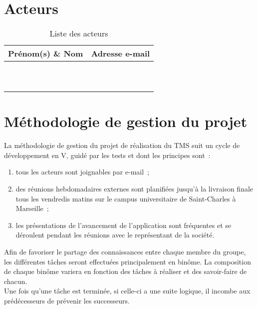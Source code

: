 \documentclass[11pt,fleqn]{report}
\begin{document}
\section{Acteurs}
\begin{table}[htbp]
	\begin{tabularx}{\linewidth}{X X}
		\toprule
		\textbf{Prénom(s) \& Nom} & \textbf{Adresse e-mail} \\
		\midrule
		\Agopian & \AgopianEmail \\
		\hline
		\Balde & \BaldeEmail \\
		\hline
		\Cadon & \CadonEmail \\
		\hline
		\Gairoard & \GairoardEmail \\
		\hline
		\Julien & \JulienEmail \\
		\hline
		\Lericolais & \LericolaisEmail \\
		\hline
		\Mezelle & \MezelleEmail \\
		\hline
		\Pachy & \PachyEmail \\
		\hline
		\SuangaWeto & \SuangaWetoEmail \\
		\hline
		\Toure & \ToureEmail \\
		\bottomrule
	\end{tabularx}
	\caption{Liste des acteurs}
	\label{Acteurs}
\end{table}

\section{Méthodologie de gestion du projet}
La méthodologie de gestion du projet de réalisation du TMS suit un cycle de développement en V, guidé par les tests et dont les principes sont~:
\begin{enumerate}
	\item tous les acteurs sont joignables par e-mail~;
	\item des réunions hebdomadaires externes sont planifiées jusqu'à la livraison finale tous les vendredis matins sur le campus universitaire de Saint-Charles à Marseille~;
	\item les présentations de l'avancement de l'application sont fréquentes et se déroulent pendant les réunions avec le représentant de la société.
\end{enumerate}
Afin de favoriser le partage des connaissances entre chaque membre du groupe, les différentes tâches seront effectuées principalement en binôme. La composition de chaque binôme variera en fonction des tâches à réaliser et des savoir-faire de chacun.
\\
Une fois qu'une tâche est terminée, si celle-ci a une suite logique, il incombe aux prédécesseurs de prévenir les successeurs.
\end{document}
